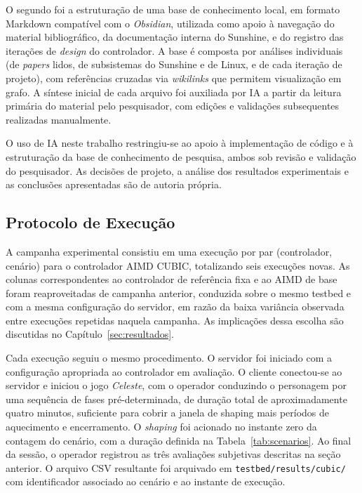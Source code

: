 O segundo foi a estruturação de uma base de conhecimento
local, em formato Markdown compatível com o \emph{Obsidian},
utilizada como apoio à navegação do material bibliográfico, da
documentação interna do Sunshine, e do registro das iterações
de \emph{design} do controlador. A base é composta por
análises individuais (de \emph{papers} lidos, de subsistemas
do Sunshine e de Linux, e de cada iteração de projeto), com
referências cruzadas via \emph{wikilinks} que permitem
visualização em grafo. A síntese inicial de cada arquivo foi
auxiliada por IA a partir da leitura primária do material pelo
pesquisador, com edições e validações subsequentes realizadas
manualmente.

O uso de IA neste trabalho restringiu-se ao apoio à
implementação de código e à estruturação da base de
conhecimento de pesquisa, ambos sob revisão e validação do
pesquisador. As decisões de projeto, a análise dos resultados
experimentais e as conclusões apresentadas são de autoria
própria.

\subsection{Protocolo de Execução}

A campanha experimental consistiu em uma execução por par
(controlador, cenário) para o controlador AIMD CUBIC,
totalizando seis execuções novas. As colunas correspondentes
ao controlador de referência fixa e ao AIMD de base foram
reaproveitadas de campanha anterior, conduzida sobre o mesmo
testbed e com a mesma configuração do servidor, em razão da
baixa variância observada entre execuções repetidas naquela
campanha. As implicações dessa escolha são discutidas no
Capítulo~\ref{sec:resultados}.

Cada execução seguiu o mesmo procedimento. O servidor foi
iniciado com a configuração apropriada ao controlador em
avaliação. O cliente conectou-se ao servidor e iniciou o jogo
\emph{Celeste}, com o operador conduzindo o personagem por uma
sequência de fases pré-determinada, de duração total de
aproximadamente quatro minutos, suficiente para cobrir a janela
de shaping mais períodos de aquecimento e encerramento. O \emph{shaping} foi acionado no instante zero
da contagem do cenário, com a duração definida na
Tabela~\ref{tab:scenarios}. Ao final da sessão, o operador
registrou as três avaliações subjetivas descritas na seção
anterior. O arquivo CSV resultante foi arquivado em
\texttt{testbed/results/cubic/} com identificador associado ao
cenário e ao instante de execução.
